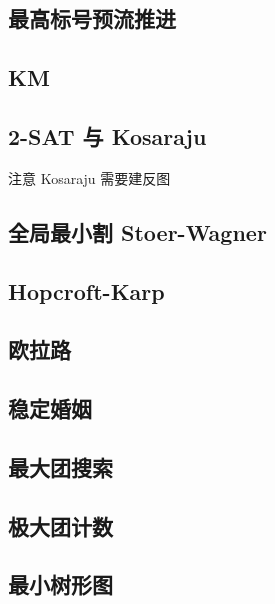 \documentclass[landscape, twocolumn, 8pt, a4paper, twoside]{extarticle}
\begin{document}
  \subsection{最高标号预流推进}
    
  
  \subsection{KM}
    

  \subsection{2-SAT 与 Kosaraju}
    注意 Kosaraju 需要建反图
    

  \subsection{全局最小割 Stoer-Wagner}
    

  \subsection{Hopcroft-Karp}
    

  \subsection{欧拉路}
    

  \subsection{稳定婚姻}
    

  \subsection{最大团搜索}
    
  
  \subsection{极大团计数}
    

  \subsection{最小树形图}
    
\end{document}
